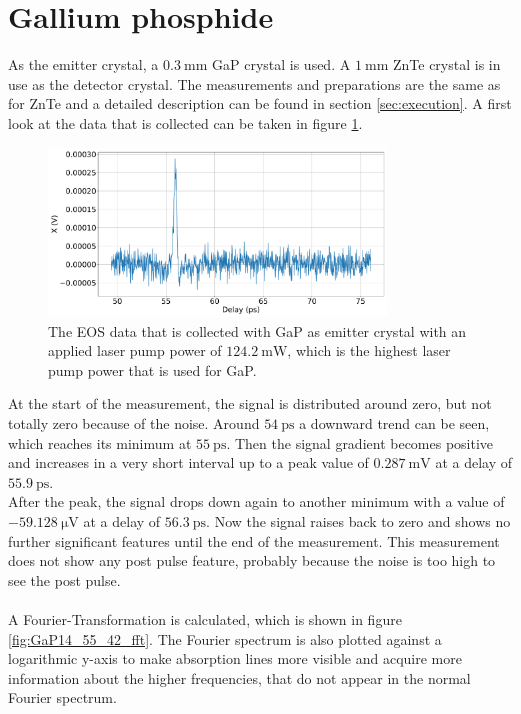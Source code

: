\section{Gallium phosphide}
As the emitter crystal, a $\SI{0.3}{\milli\meter}$ GaP crystal is used.
A $\SI{1}{\milli\meter}$ ZnTe crystal is in use as the detector crystal.
The measurements and preparations are the same as for ZnTe and a detailed description can be found in section \ref{sec:execution}.
A first look at the data that is collected can be taken in figure \ref{fig:GaP14_55_42normalX}.\FloatBarrier
\begin{figure}
    \centering
    \includegraphics[width=0.8\textwidth]{Plots/GaP14_55_42normalX.pdf}
    \caption{The EOS data that is collected with GaP as emitter crystal with an applied laser pump power of $\SI{124.2}{\milli\W}$, which is the highest laser pump power that is used for GaP.}
    \label{fig:GaP14_55_42normalX}
\end{figure}\FloatBarrier
At the start of the measurement, the signal is distributed around zero, but not totally zero because of the noise.
Around $\SI{54}{\pico\second}$ a downward trend can be seen, which reaches its minimum at $\SI{55}{\pico\second}$.
Then the signal gradient becomes positive and increases in a very short interval up to a peak value of $\SI{0.287}{\milli\V}$ at a delay of $\SI{55.9}{\pico\second}$.
\\
After the peak, the signal drops down again to another minimum with a value of $\SI{-59.128}{\micro\V}$ at a delay of $\SI{56.3}{\pico\second}$.
Now the signal raises back to zero and shows no further significant features until the end of the measurement.
This measurement does not show any post pulse feature, probably because the noise is too high to see the post pulse.
\\\\
A Fourier-Transformation is calculated, which is shown in figure \ref{fig:GaP14_55_42_fft}.
The Fourier spectrum is also plotted against a logarithmic y-axis to make absorption lines more visible and acquire more information about the higher frequencies, that do not appear in the normal Fourier spectrum.
